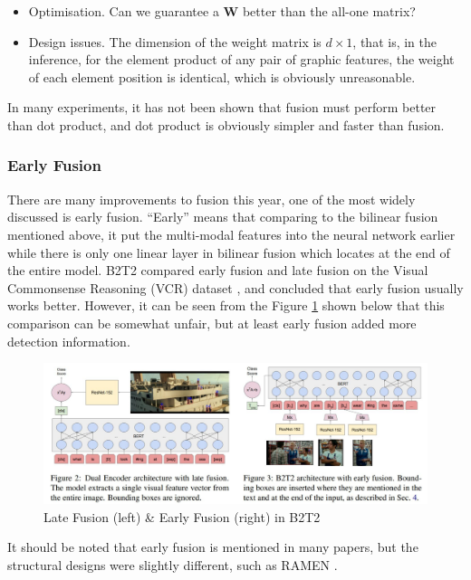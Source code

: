\begin{itemize}
    \item Optimisation. Can we guarantee a $\mathbf{W}$ better than the all-one matrix?
    \item Design issues. The dimension of the weight matrix is $d\times1$, that is, in the inference, for the element product of any pair of graphic features, the weight of each element position is identical, which is obviously unreasonable.
\end{itemize}

In many experiments, it has not been shown that fusion must perform better than dot product, and dot product is obviously simpler and faster than fusion.

\subsubsection{Early Fusion}
There are many improvements to fusion this year, one of the most widely discussed is early fusion. ``Early'' means that comparing to the bilinear fusion mentioned above, it put the multi-modal features into the neural network earlier while there is only one linear layer in bilinear fusion which locates at the end of the entire model. B2T2 \cite{B2T2} compared early fusion and late fusion on the Visual Commonsense Reasoning (VCR) dataset \cite{zellers2019vcr}, and concluded that early fusion usually works better. However, it can be seen from the Figure \ref{fig:fusionb2t2} shown below that this comparison can be somewhat unfair, but at least early fusion added more detection information.

\begin{figure}[h!]
\centering
\includegraphics[width=\textwidth]{fusion.pdf}
\caption{Late Fusion (left) \& Early Fusion (right) in B2T2 \cite{B2T2}}
\label{fig:fusionb2t2}
\end{figure}

It should be noted that early fusion is mentioned in many papers, but the structural designs were slightly different, such as RAMEN \cite{ramen}.

